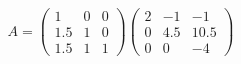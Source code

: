 \documentclass[pdf]{beamer}
\begin{document}
\begin{frame}{}$$A=\begin{pmatrix}1&0&0\\1.5&1&0\\1.5&1&1\end{pmatrix} \begin{pmatrix}2&-1&-1\\0&4.5&10.5\\0&0&-4\end{pmatrix}$$
\end{frame}
\end{document}
